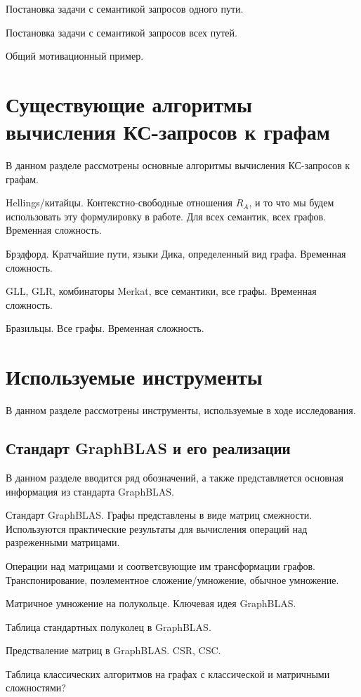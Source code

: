 Постановка задачи с семантикой запросов одного пути.

Постановка задачи с семантикой запросов всех путей.

Общий мотивационный пример.

\section{Существующие алгоритмы вычисления КС-запросов к графам}\label{sec:ch1/sec4}
В данном разделе рассмотрены основные алгоритмы вычисления КС-запросов к графам.

Hellings/китайцы. Контекстно-свободные отношения $R_A$, и то что мы будем использовать эту формулировку в работе. Для всех семантик, всех графов. Временная сложность.

Брэдфорд. Кратчайшие пути, языки Дика, определенный вид графа. Временная сложность.

GLL, GLR, комбинаторы Merkat, все семантики, все графы. Временная сложность.

Бразильцы. Все графы. Временная сложность.

\section{Используемые инструменты}\label{sec:ch1/sec5}
В данном разделе рассмотрены инструменты, используемые в ходе исследования.

\subsection{Стандарт GraphBLAS и его реализации}
В данном разделе вводится ряд обозначений, а также представляется основная информация из стандарта GraphBLAS.

Стандарт GraphBLAS. Графы представлены в виде матриц смежности. Используются практические результаты для вычисления операций над разреженными матрицами.

Операции над матрицами и соответсвующие им трансформации графов. Транспонирование, поэлементное сложение/умножение, обычное умножение.

Матричное умножение на полукольце. Ключевая идея GraphBLAS.

Таблица стандартных полуколец в GraphBLAS.

Предстваление матриц в GraphBLAS. CSR, CSC.

Таблица классических алгоритмов на графах с классической и матричными сложностями?


